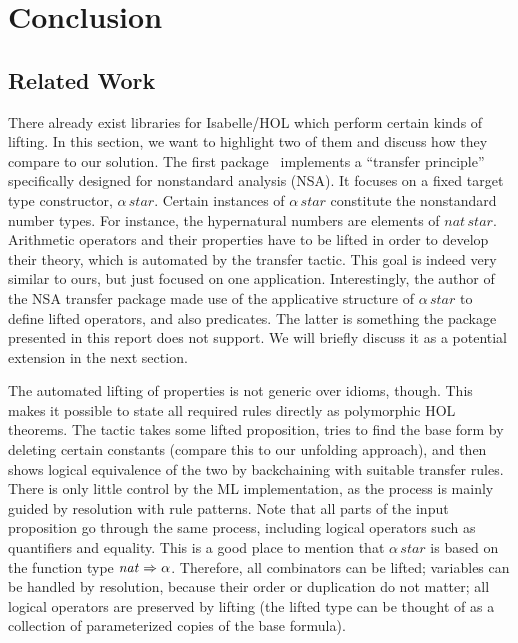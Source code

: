 \section{Conclusion}\label{sec:conclusion}

\subsection{Related Work}\label{subsec:related-work}

There already exist libraries for Isabelle/HOL which perform certain kinds of
lifting.
In this section, we want to highlight two of them and discuss how they compare
to our solution.
The first package~\cite{huffman05} implements a ``transfer principle''
specifically designed for nonstandard analysis (NSA).
It focuses on a fixed target type constructor, $\alpha\,\mathit{star}$.
Certain instances of $\alpha\,\mathit{star}$ constitute the nonstandard number
types.
For instance, the hypernatural numbers are elements of $\mathit{nat}\,\mathit{star}$.
Arithmetic operators and their properties have to be lifted in order to develop
their theory, which is automated by the transfer tactic.
This goal is indeed very similar to ours, but just focused on one application.
Interestingly, the author of the NSA transfer package made use of the applicative
structure of $\alpha\,\mathit{star}$ to define lifted operators, and also predicates.
The latter is something the package presented in this report does not support.
We will briefly discuss it as a potential extension in the next section.

The automated lifting of properties is not generic over idioms, though.
This makes it possible to state all required rules directly as polymorphic
HOL theorems.
The tactic takes some lifted proposition, tries to find the base form by
deleting certain constants (compare this to our unfolding approach), and then
shows logical equivalence of the two by backchaining with suitable transfer
rules.
There is only little control by the ML implementation, as the process is mainly
guided by resolution with rule patterns.
Note that all parts of the input proposition go through the same process,
including logical operators such as quantifiers and equality.
This is a good place to mention that $\alpha\,\mathit{star}$ is based
on the function type $\mathit{nat} \Rightarrow \alpha$.
Therefore, all combinators can be lifted; variables can be handled by
resolution, because their order or duplication do not matter; all logical
operators are preserved by lifting (the lifted type can be thought of
as a collection of parameterized copies of the base formula).

